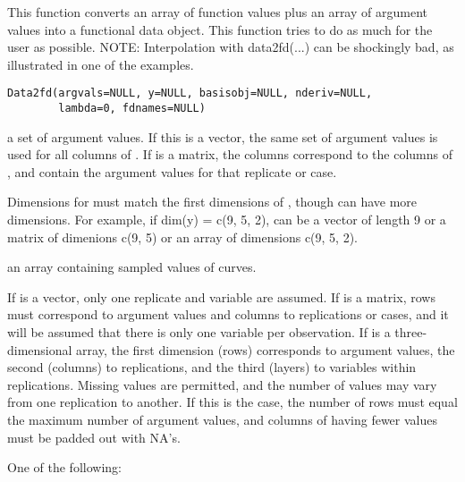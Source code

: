 \documentclass{article}
\begin{document}
\begin{Description}\relax
This function converts an array  of function values plus an
array  of argument values into a functional data object.
This function tries to do as much for the user as possible.  NOTE:
Interpolation with data2fd(...) can be shockingly bad, as illustrated
in one of the examples.
\end{Description}
\begin{Usage}
\begin{verbatim}
Data2fd(argvals=NULL, y=NULL, basisobj=NULL, nderiv=NULL,
        lambda=0, fdnames=NULL)
\end{verbatim}
\end{Usage}
\begin{Arguments}
\begin{ldescription}
\item[\code{argvals}] a set of argument values.  If this is a vector, the same set of
argument values is used for all columns of .  If
 is a matrix, the columns correspond to the columns of
, and contain the argument values for that replicate or
case.

Dimensions for  must match the first dimensions of
, though  can have more dimensions.  For example, if
dim(y) = c(9, 5, 2),  can be a vector of length 9 or a
matrix of dimenions c(9, 5) or an array of dimensions c(9, 5, 2).  

\item[\code{y}] an array containing sampled values of curves.

If  is a vector, only one replicate and variable are
assumed.  If  is a matrix, rows must correspond to argument 
values and columns to replications or cases, and it will be assumed
that there is only one variable per observation.  If  is a
three-dimensional array, the first dimension (rows) corresponds to
argument values, the second (columns) to replications, and the third
(layers) to variables within replications.  Missing values are
permitted, and the number of values may vary from one replication to
another.  If this is the case, the number of rows must equal the
maximum number of argument values, and columns of  having
fewer values must be padded out with NA's.   

\item[\code{basisobj}] One of the following:


\end{ldescription}
\end{Arguments}
\end{document}
